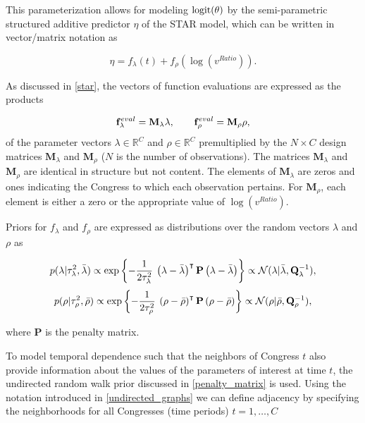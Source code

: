 This parameterization allows for modeling ${\rm logit}(\theta)$ by the semi-parametric structured 
additive predictor $\eta$ of the STAR model, which can be written in vector/matrix notation 
as 

\begin{equation*}
 \eta = f_\lambda(t) +  f_\rho(\log{(v^{Ratio})}). 
\end{equation*}

\noindent As discussed in \ref{star}, the vectors of function evaluations are 
expressed as the products 

\begin{equation*}
\mathbf{f}^{eval}_\lambda = \mathbf{M}_\lambda \lambda, 
\qquad 
\mathbf{f}^{eval}_\rho =  \mathbf{M}_\rho \rho, 
\end{equation*}
%
\noindent of the parameter vectors $\lambda \in \mathbb{R}^C$ and $\rho \in \mathbb{R}^C$ 
premultiplied by the $N \times C$ design matrices  $\mathbf{M}_\lambda$ and  $\mathbf{M}_\rho$ 
($N$ is the number of observations). The matrices $\mathbf{M}_\lambda$ and $\mathbf{M}_\rho$ 
are identical in structure but not content. The elements of $\mathbf{M}_\lambda$ are zeros and ones 
indicating the Congress to which each observation pertains. For $\mathbf{M}_\rho$, each element is 
either a zero or the appropriate value of $\log{(v^{Ratio})}$. 


Priors for $f_{\lambda}$ and $f_{\rho}$ are expressed as distributions over the random 
vectors $\lambda$ and $\rho$ as 

\begin{equation*}
p(\lambda | \tau_\lambda^2, \bar{\lambda}) 
\propto 
\exp{\left\{-\frac{1}{2\tau_\lambda^2} \: \left(\lambda - \bar{\lambda}\right)^\intercal  \mathbf{P}   
\left(\lambda - \bar{\lambda}\right) \right\}} 
\propto 
\mathcal{N} (\lambda | \bar{\lambda}, \mathbf{Q}_\lambda^{-1}), 
\end{equation*}
\begin{equation*}
p(\rho | \tau_\rho^2, \bar{\rho}) 
\propto 
\exp{\left\{-\frac{1}{2\tau_\rho^2} \: \left(\rho - \bar{\rho}\right)^\intercal  \mathbf{P} 
\left(\rho-\bar{\rho}\right) \right\}} 
\propto 
\mathcal{N} (\rho | \bar{\rho}, \mathbf{Q}_\rho^{-1}), 
\end{equation*}

\noindent where $\mathbf{P}$ is the penalty matrix.

To model temporal dependence such that the neighbors of Congress $t$ also provide 
information about the values of the parameters of interest at time $t$, the undirected 
random walk prior discussed in \ref{penalty_matrix} is used. Using the notation 
introduced in \ref{undirected_graphs} we can define adjacency by specifying the 
neighborhoods for all Congresses (time periods) $t = 1, \dots, C$

